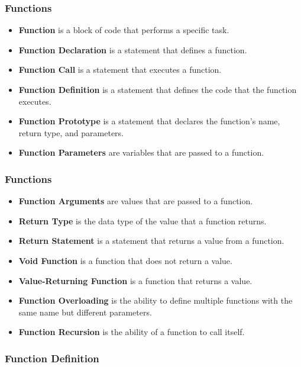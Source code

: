 \begin{frame}
    \frametitle{Functions}
\begin{itemize}
    \item \textbf{Function} is a block of code that performs a specific task.
    \item \textbf{Function Declaration} is a statement that defines a function.
    \item \textbf{Function Call} is a statement that executes a function.
    \item \textbf{Function Definition} is a statement that defines the code that the function executes.
    \item \textbf{Function Prototype} is a statement that declares the function's name, return type, and parameters.
    \item \textbf{Function Parameters} are variables that are passed to a function.
\end{itemize}
\end{frame}
    
\begin{frame}
    \frametitle{Functions}
    \begin{itemize}
    \item \textbf{Function Arguments} are values that are passed to a function.
    \item \textbf{Return Type} is the data type of the value that a function returns.
    \item \textbf{Return Statement} is a statement that returns a value from a function.
    \item \textbf{Void Function} is a function that does not return a value.
    \item \textbf{Value-Returning Function} is a function that returns a value.
    \item \textbf{Function Overloading} is the ability to define multiple functions with the same name but different parameters.
    \item \textbf{Function Recursion} is the ability of a function to call itself.
    \end{itemize}
\end{frame}

\begin{frame}[fragile]
    \frametitle{Function Definition}
    
\end{frame}